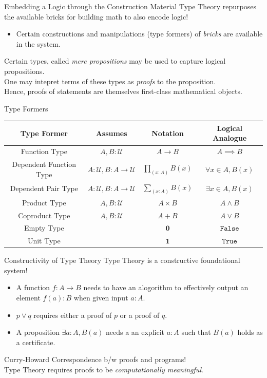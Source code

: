 \documentclass[10pt, aspectratio=169]{beamer}
\newcommand{\U}{\mathcal{U}}
\newcommand{\Prod}[2]{\prod_{(#1)}{#2}}
\newcommand{\Sum}[2]{\sum_{(#1)}{#2}}
\newcommand{\0}{\mathbf{0}}
\newcommand{\1}{\mathbf{1}}
\newcommand{\2}{\mathbf{2}}
\begin{document}
\begin{frame}{Embedding a Logic through the Construction Material}
Type Theory repurposes the available bricks for building math to also encode logic!
\begin{itemize}
  \item Certain constructions and manipulations (type formers) of \emph{bricks} are available in the system.
\end{itemize}
Certain types, called \emph{mere propositions} may be used to capture logical propositions.\\
One may intepret terms of these types as \emph{proofs} to the proposition. \\
Hence, proofs of statements are themselves first-class mathematical objects.
\end{frame}

\begin{frame}{Type Formers}
  \centering
  \begin{tabular}{c c c c}
  \hline
  \textbf{Type Former} & \textbf{Assumes} & \textbf{Notation} & \textbf{Logical Analogue} \\
  \hline
  Function Type             & $A, B : \U$           & $A \to B$             & $A \implies B$ \\
  Dependent Function Type   & $A : \U, B : A \to \U $ & $\Prod{x:A}{B(x)}$  & $\forall x \in A, B(x)$ \\
  Dependent Pair Type       & $A : \U, B : A \to \U$  & $\Sum{x:A}{B(x)}$   & $\exists x \in A, B(x)$ \\
  Product Type              & $A, B : \U$           & $A \times B$             & $A \land B$ \\
  Coproduct Type            & $A, B : \U$           & $A + B$             & $A \lor B$ \\
  Empty Type                & & $\0$                & $\mathtt{False}$ \\
  Unit Type                 & & $\1$                & $\mathtt{True}$ \\
  \hline
  \end{tabular}
\end{frame}

\begin{frame}{Constructivity of Type Theory}
  Type Theory is a constructive foundational system!
  \begin{itemize}
    \item A function $f : A \to B$ needs to have an alogorithm to effectively output an element $f(a) : B$ when given input $a : A$.
    \item $p \lor q$ requires either a proof of $p$ or a proof of $q$.
    \item A proposition $\exists a : A, B(a)$ needs a an explicit $a : A$ such that $B(a)$ holds as a certificate.
  \end{itemize}
  Curry-Howard Correspondence b/w proofs and programs! \\
  Type Theory requires proofs to be \emph{computationally meaningful}.
\end{frame}
\end{document}
